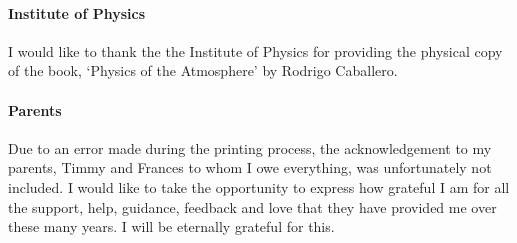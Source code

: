 \paragraph{Institute of Physics}
I would like to thank the the Institute of Physics for providing the physical copy of the book, `Physics of the Atmosphere' by Rodrigo Caballero.

\paragraph{Parents} Due to an error made during the printing process, the acknowledgement to my parents, Timmy and Frances to whom I owe everything, was unfortunately not included. I would like to take the opportunity to express how grateful I am for all the support, help, guidance, feedback and love that they have provided me over these many years. I will be eternally grateful for this.
